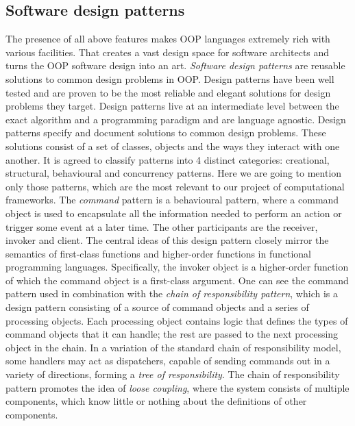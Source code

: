 \subsection{Software design patterns}
\label{background_design}
\quad The presence of all above features makes OOP languages extremely rich with various facilities. That creates a vast design space for software architects and turns the OOP software design into an art. \textit{Software design patterns} \cite{gang-of-four} are reusable solutions to common design problems in OOP. Design patterns have been well tested and are proven to be the most reliable and elegant solutions for design problems they target.\newline\null
\quad Design patterns live at an intermediate level between the exact algorithm and a programming paradigm and are language agnostic. Design patterns specify and document solutions to common design problems. These solutions consist of a set of classes, objects and the ways they interact with one another. It is agreed to classify patterns into 4 distinct categories: creational, structural, behavioural and concurrency patterns. Here we are going to mention only those patterns, which are the most relevant to our project of computational frameworks.\newline\null
\quad The \textit{command} pattern is a behavioural pattern, where a command object is used to encapsulate all the information needed to perform an action or trigger some event at a later time. The other participants are the receiver, invoker and client. The central ideas of this design pattern closely mirror the semantics of first-class functions and higher-order functions in functional programming languages. Specifically, the invoker object is a higher-order function of which the command object is a first-class argument.\newline\null
\quad One can see the command pattern used in combination with the \textit{chain of responsibility pattern}, which is a design pattern consisting of a source of command objects and a series of processing objects. Each processing object contains logic that defines the types of command objects that it can handle; the rest are passed to the next processing object in the chain. In a variation of the standard chain of responsibility model, some handlers may act as dispatchers, capable of sending commands out in a variety of directions, forming a \textit{tree of responsibility}. The chain of responsibility pattern promotes the idea of \textit{loose coupling}, where the system consists of multiple components, which know little or nothing about the definitions of other components.\newline\null
